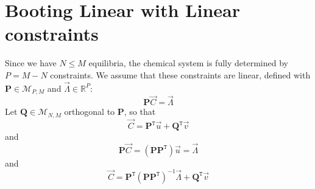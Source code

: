 \documentclass[aps,12pt]{revtex4}
\newcommand{\trn}[1]{{#1}^{\mathtt{T}}}
\begin{document}
\section{Booting Linear with Linear constraints}
Since we have $N\leq M$ equilibria, the chemical system is fully determined by
$P=M-N$ constraints.
We assume that these constraints are linear, defined with $\bm{P}\in\mathcal{M}_{P,M}$ and $\vec{\Lambda}\in\mathbb{R}^P$:
\begin{equation}
	\bm{P} \vec{C} = \vec{\Lambda}
\end{equation}
Let $\bm{Q}\in\mathcal{M}_{N,M}$ orthogonal to $\bm{P}$, so that
\begin{equation}
	\vec{C} = \trn{\bm{P}} \vec{u} + \trn{\bm{Q}} \vec{v}
\end{equation}
and
\begin{equation}
	\bm{P} \vec{C} = \left(\bm{P} \trn{\bm{P}}\right) \vec{u} = \vec{\Lambda}
\end{equation}
and
\begin{equation}
	\vec{C} = \trn{\bm{P}} \left(\bm{P} \trn{\bm{P}}\right)^{-1} \vec{\Lambda}+ \trn{\bm{Q}} \vec{v}
\end{equation}
\end{document}
